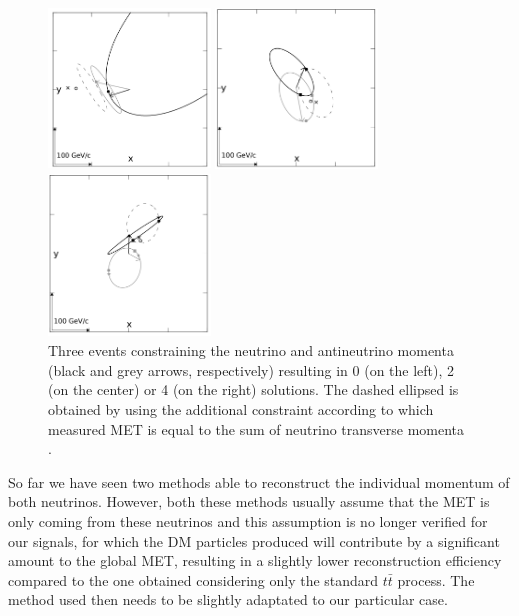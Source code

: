 \documentclass[a4paper, 10pt, openright]{report}
\begin{document}
\begin{itemize}
\begin{figure}[htbp]
\centering
\begin{minipage}[b]{.32\textwidth}
\includegraphics[width=4.3cm, height=4.3cm]{figs/ellipse0.png}
\end{minipage}\hfill
\begin{minipage}[b]{.32\textwidth}
\includegraphics[width=4.3cm, height=4.3cm]{figs/ellipse2.png}
\end{minipage} \hfill
\begin{minipage}[b]{.32\textwidth}
\includegraphics[width=4.3cm, height=4.3cm]{figs/ellipse4.png}
\end{minipage} \hfill
\caption{ Three events constraining the neutrino and antineutrino momenta (black and grey arrows, respectively) resulting in 0 (on the left), 2 (on the center) or 4 (on the right) solutions. The dashed ellipsed is obtained by using the additional constraint according to which measured \ac{MET} is equal to the sum of neutrino transverse momenta \cite{Betchart}.}
\label{fig:ellipses}
\end{figure}

\end{itemize}

So far we have seen two methods able to reconstruct the individual momentum of both neutrinos. However, both these methods usually assume that the \ac{MET} is only coming from these neutrinos and this assumption is no longer verified for our signals, for which the \ac{DM} particles produced will contribute by a significant amount to the global \ac{MET}, resulting in a slightly lower reconstruction efficiency compared to the one obtained considering only the standard $t \bar t$ process. The method used then needs to be slightly adaptated to our particular case.
\end{document}
